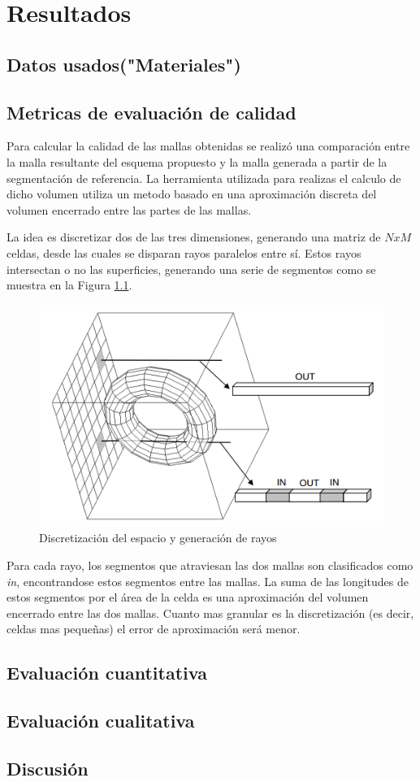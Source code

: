 \chapter{Resultados}
\section{Datos usados("Materiales")}
\section{Metricas de evaluación de calidad}
Para calcular la calidad de las mallas obtenidas se realizó una comparación entre la malla resultante del esquema propuesto y la malla generada a partir de la segmentación de referencia. La herramienta utilizada para realizas el calculo de dicho volumen utiliza un metodo basado en una aproximación discreta del volumen encerrado entre las partes de las mallas.

La idea es discretizar dos de las tres dimensiones, generando una matriz de $ N x M $ celdas, desde las cuales se disparan rayos paralelos entre sí. Estos rayos intersectan o no las superficies, generando una serie de segmentos como se muestra en la Figura \ref{fig:discretizacionvolumen}. 

\begin{figure}[h]
\centering
\includegraphics[scale=0.5]{images/disctretizacion.png}
\caption{Discretización del espacio y generación de rayos}
\label{fig:discretizacionvolumen}
\end{figure}

Para cada rayo, los segmentos que atraviesan las dos mallas son clasificados como \emph{in}, encontrandose estos segmentos entre las mallas. La suma de las longitudes de estos segmentos por el área de la celda es una aproximación del volumen encerrado entre las dos mallas. Cuanto mas granular es la discretización (es decir, celdas mas pequeñas) el error de aproximación será menor.
\section{Evaluación cuantitativa}
\section{Evaluación cualitativa}
\section{Discusión}